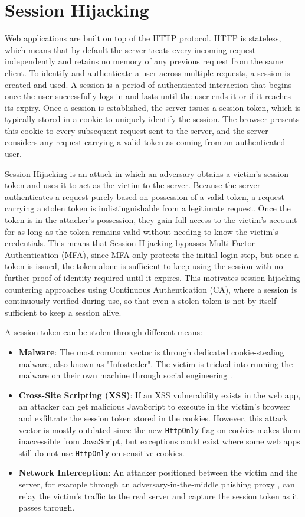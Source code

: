 \section{Session Hijacking}
Web applications are built on top of the HTTP protocol. HTTP is stateless, which means that by default the server treats every incoming request independently and retains no memory of any previous request from the same client. To identify and authenticate a user across multiple requests, a session is created and used. A session is a period of authenticated interaction that begins once the user successfully logs in and lasts until the user ends it or if it reaches its expiry. Once a session is established, the server issues a session token, which is typically stored in a cookie \cite{rfc6265} to uniquely identify the session. The browser presents this cookie to every subsequent request sent to the server, and the server considers any request carrying a valid token as coming from an authenticated user.

Session Hijacking is an attack in which an adversary obtains a victim's session token and uses it to act as the victim to the server. Because the server authenticates a request purely based on possession of a valid token, a request carrying a stolen token is indistinguishable from a legitimate request. Once the token is in the attacker's possession, they gain full access to the victim's account for as long as the token remains valid without needing to know the victim's credentials. This means that Session Hijacking bypasses Multi-Factor Authentication (MFA), since MFA only protects the initial login step, but once a token is issued, the token alone is sufficient to keep using the session with no further proof of identity required until it expires. This motivates session hijacking countering approaches using Continuous Authentication (CA), where a session is continuously verified during use, so that even a stolen token is not by itself sufficient to keep a session alive.

A session token can be stolen through different means:
\begin{itemize}
    \item \textbf{Malware}: The most common vector is through dedicated cookie-stealing malware, also known as "Infostealer". The victim is tricked into running the malware on their own machine through social engineering \cite{shen2021phishing}.
    \item \textbf{Cross-Site Scripting (XSS)}: If an XSS vulnerability exists in the web app, an attacker can get malicious JavaScript to execute in the victim's browser and exfiltrate the session token stored in the cookies. However, this attack vector is mostly outdated since the new \verb|HttpOnly| flag on cookies makes them inaccessible from JavaScript, but exceptions could exist where some web apps still do not use \verb|HttpOnly| on sensitive cookies. 
    \item \textbf{Network Interception}: An attacker positioned between the victim and the server, for example through an adversary-in-the-middle phishing proxy \cite{evilginx2_kgretzky_2024}, can relay the victim's traffic to the real server and capture the session token as it passes through.
\end{itemize}

